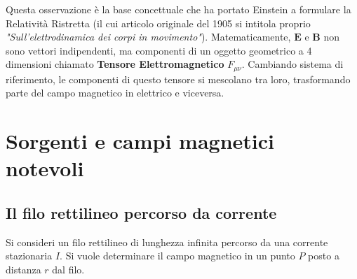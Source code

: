 \documentclass[a4paper,11pt]{report}
\begin{document}
\begin{approfondimento}[colback= white, colframe=green!35!black, no shadow, title={Unificazione Elettromagnetica}]
    Questa osservazione è la base concettuale che ha portato Einstein a formulare la Relatività Ristretta (il cui articolo originale del 1905 si intitola proprio \textit{"Sull'elettrodinamica dei corpi in movimento"}).
    Matematicamente, $\bm{E}$ e $\bm{B}$ non sono vettori indipendenti, ma componenti di un oggetto geometrico a 4 dimensioni chiamato \textbf{Tensore Elettromagnetico} $F_{\mu\nu}$. Cambiando sistema di riferimento, le componenti di questo tensore si mescolano tra loro, trasformando parte del campo magnetico in elettrico e viceversa.
\end{approfondimento}




\chapter{Sorgenti e campi magnetici notevoli}

\section{Il filo rettilineo percorso da corrente}
\label{sec:biot_savart}

Si consideri un filo rettilineo di lunghezza infinita percorso da una corrente stazionaria $I$. Si vuole determinare il campo magnetico in un punto $P$ posto a distanza $r$ dal filo.
\end{document}
